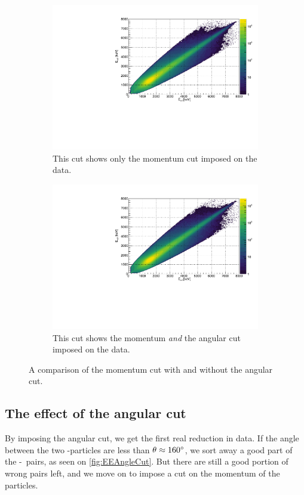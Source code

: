 \begin{figure}[H]
	\begin{subfigure}[t]{0.5\linewidth}
		\includegraphics[width=\linewidth]{../figures/EEMomentumCut.pdf}
		\caption{This cut shows only the momentum cut imposed on the data.}
	\end{subfigure}
	\begin{subfigure}[t]{0.5\linewidth}
		\includegraphics[width=\linewidth]{../figures/EEAngAndMoment.pdf}
		\caption{This cut shows the momentum \textit{and} the angular cut imposed on the data.}
	\end{subfigure}
\caption{A comparison of the momentum cut with and without the angular cut.}
\label{fig:AngAndMomentCompare}
\end{figure}

\subsection{The effect of the angular cut}
By imposing the angular cut, we get the first real reduction in data. If the angle between the two \al-particles are less than $\theta \approx 160\degree$, we sort away a good part of the \be-\al\ pairs, as seen on \cref{fig:EEAngleCut}. But there are still a good portion of wrong pairs left, and we move on to impose a cut on the momentum of the particles. 


